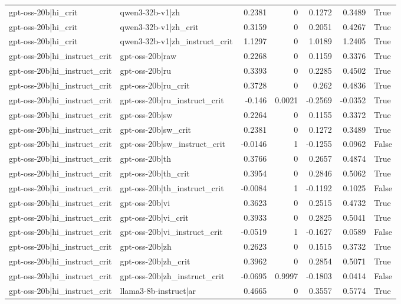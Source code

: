 \begin{table}
\begin{tabular}{l l r r r r l}
gpt-oss-20b|hi_crit & qwen3-32b-v1|zh & 0.2381 & 0 & 0.1272 & 0.3489 & True \\
gpt-oss-20b|hi_crit & qwen3-32b-v1|zh_crit & 0.3159 & 0 & 0.2051 & 0.4267 & True \\
gpt-oss-20b|hi_crit & qwen3-32b-v1|zh_instruct_crit & 1.1297 & 0 & 1.0189 & 1.2405 & True \\
gpt-oss-20b|hi_instruct_crit & gpt-oss-20b|raw & 0.2268 & 0 & 0.1159 & 0.3376 & True \\
gpt-oss-20b|hi_instruct_crit & gpt-oss-20b|ru & 0.3393 & 0 & 0.2285 & 0.4502 & True \\
gpt-oss-20b|hi_instruct_crit & gpt-oss-20b|ru_crit & 0.3728 & 0 & 0.262 & 0.4836 & True \\
gpt-oss-20b|hi_instruct_crit & gpt-oss-20b|ru_instruct_crit & -0.146 & 0.0021 & -0.2569 & -0.0352 & True \\
gpt-oss-20b|hi_instruct_crit & gpt-oss-20b|sw & 0.2264 & 0 & 0.1155 & 0.3372 & True \\
gpt-oss-20b|hi_instruct_crit & gpt-oss-20b|sw_crit & 0.2381 & 0 & 0.1272 & 0.3489 & True \\
gpt-oss-20b|hi_instruct_crit & gpt-oss-20b|sw_instruct_crit & -0.0146 & 1 & -0.1255 & 0.0962 & False \\
gpt-oss-20b|hi_instruct_crit & gpt-oss-20b|th & 0.3766 & 0 & 0.2657 & 0.4874 & True \\
gpt-oss-20b|hi_instruct_crit & gpt-oss-20b|th_crit & 0.3954 & 0 & 0.2846 & 0.5062 & True \\
gpt-oss-20b|hi_instruct_crit & gpt-oss-20b|th_instruct_crit & -0.0084 & 1 & -0.1192 & 0.1025 & False \\
gpt-oss-20b|hi_instruct_crit & gpt-oss-20b|vi & 0.3623 & 0 & 0.2515 & 0.4732 & True \\
gpt-oss-20b|hi_instruct_crit & gpt-oss-20b|vi_crit & 0.3933 & 0 & 0.2825 & 0.5041 & True \\
gpt-oss-20b|hi_instruct_crit & gpt-oss-20b|vi_instruct_crit & -0.0519 & 1 & -0.1627 & 0.0589 & False \\
gpt-oss-20b|hi_instruct_crit & gpt-oss-20b|zh & 0.2623 & 0 & 0.1515 & 0.3732 & True \\
gpt-oss-20b|hi_instruct_crit & gpt-oss-20b|zh_crit & 0.3962 & 0 & 0.2854 & 0.5071 & True \\
gpt-oss-20b|hi_instruct_crit & gpt-oss-20b|zh_instruct_crit & -0.0695 & 0.9997 & -0.1803 & 0.0414 & False \\
gpt-oss-20b|hi_instruct_crit & llama3-8b-instruct|ar & 0.4665 & 0 & 0.3557 & 0.5774 & True \\

\end{tabular}
\end{table}
